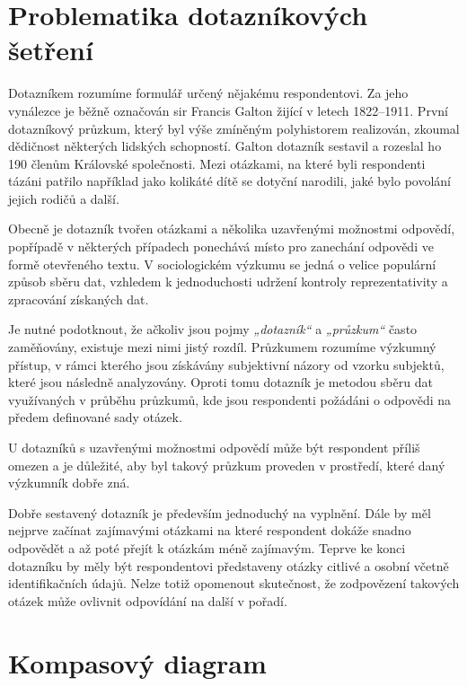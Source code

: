 \section{Problematika dotazníkových šetření}
Dotazníkem rozumíme formulář určený nějakému respondentovi. Za jeho vynálezce
je běžně označován sir Francis Galton žijící v letech 1822–1911. První dotazníkový
průzkum, který byl výše zmíněným polyhistorem realizován, zkoumal dědičnost některých
lidských schopností. Galton dotazník sestavil a rozeslal ho 190 členům Královské společnosti.
Mezi otázkami, na které byli respondenti tázáni patřilo například jako kolikáté dítě se dotyční
narodili, jaké bylo povolání jejich rodičů a další.~\cite{jandourek2012slovnik}

Obecně je dotazník tvořen otázkami a několika uzavřenými možnostmi odpovědí, popřípadě
v některých případech ponechává místo pro zanechání odpovědi ve formě otevřeného textu.
V sociologickém výzkumu se jedná o velice populární způsob sběru dat, vzhledem k jednoduchosti
udržení kontroly reprezentativity a zpracování získaných dat.~\cite{jandourek2012slovnik}

Je nutné podotknout, že ačkoliv jsou pojmy \textit{„dotazník“} a \textit{„průzkum“}
často zaměňovány, existuje mezi nimi jistý rozdíl. Průzkumem rozumíme výzkumný přístup,
v rámci kterého jsou získávány subjektivní názory od vzorku subjektů, které jsou následně analyzovány.
Oproti tomu dotazník je metodou sběru dat využívaných v průběhu průzkumů, kde jsou respondenti
požádáni o odpovědi na předem definované sady otázek.~\cite{lau2017methods}

U dotazníků s uzavřenými možnostmi odpovědí může být respondent příliš omezen a je důležité,
aby byl takový průzkum proveden v prostředí, které daný výzkumník dobře zná.~\cite{jandourek2012slovnik}

Dobře sestavený dotazník je především jednoduchý na vyplnění. Dále by měl nejprve začínat
zajímavými otázkami na které respondent dokáže snadno odpovědět a až poté přejít k otázkám
méně zajímavým. Teprve ke konci dotazníku by měly být respondentovi představeny otázky citlivé
a osobní včetně identifikačních údajů. Nelze totiž opomenout skutečnost, že zodpovězení takových
otázek může ovlivnit odpovídání na další v pořadí.~\cite{jandourek2012slovnik}

\section{Kompasový diagram}
\label{subsection:compassdiagram}

